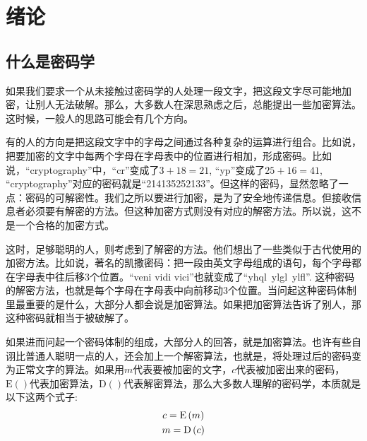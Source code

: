 \chapter{绪论}
\section{什么是密码学}
如果我们要求一个从未接触过密码学的人处理一段文字，把这段文字尽可能地加密，让别人无法破解。那么，大多数人在深思熟虑之后，总能提出一些加密算法。这时候，一般人的思路可能会有几个方向。\par
有的人的方向是把这段文字中的字母之间通过各种复杂的运算进行组合。比如说，把要加密的文字中每两个字母在字母表中的位置进行相加，形成密码。比如说，``cryptography''中，``cr''变成了$3+18=21$, ``yp''变成了$25+16=41$, ``cryptography''对应的密码就是``214135252133''。但这样的密码，显然忽略了一点：密码的可解密性。我们之所以要进行加密，是为了安全地传递信息。但接收信息者必须要有解密的方法。但这种加密方式则没有对应的解密方法。所以说，这不是一个合格的加密方式。\par
这时，足够聪明的人，则考虑到了解密的方法。他们想出了一些类似于古代使用的加密方法。比如说，著名的凯撒密码：把一段由英文字母组成的语句，每个字母都在字母表中往后移3个位置。``veni vidi vici''也就变成了``yhql ylgl ylfl''. 这种密码的解密方法，也就是每个字母在字母表中向前移动3个位置。当问起这种密码体制里最重要的是什么，大部分人都会说是加密算法。如果把加密算法告诉了别人，那这种密码就相当于被破解了。\par
如果进而问起一个密码体制的组成，大部分人的回答，就是加密算法。也许有些自诩比普通人聪明一点的人，还会加上一个解密算法，也就是，将处理过后的密码变为正常文字的算法。如果用$m$代表要被加密的文字，$c$代表被加密出来的密码，$\mathrm{E}()$代表加密算法，$\mathrm{D}()$代表解密算法，那么大多数人理解的密码学，本质就是以下这两个式子:
\begin{gather*}
    c=\mathrm{E}\left( {m}\right)\\
    m=\mathrm{D}\left( {c}\right)
\end{gather*}

